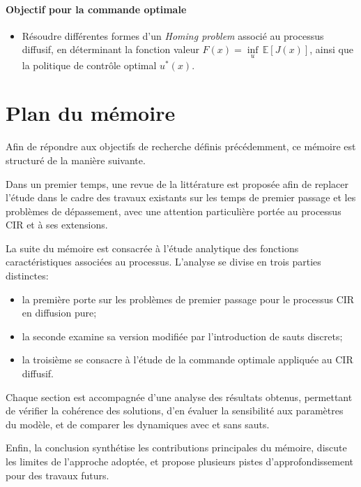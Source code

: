 \paragraph{Objectif pour la commande optimale}
\begin{itemize}
    \item Résoudre différentes formes d'un \textit{Homing problem} associé au processus diffusif, en déterminant la fonction valeur \( F(x) = \underset{u}{\inf}\,\mathds{E}[J(x)] \), ainsi que la politique de contrôle optimal $u^*(x)$.
\end{itemize}

\section{Plan du mémoire}  %
Afin de répondre aux objectifs de recherche définis précédemment, ce mémoire est structuré de la manière suivante.

Dans un premier temps, une revue de la littérature est proposée afin de replacer l'étude dans le cadre des travaux existants sur les temps de premier passage et les problèmes de dépassement, avec une attention particulière portée au processus \acs{CIR} et à ses extensions.

La suite du mémoire est consacrée à l'étude analytique des fonctions caractéristiques associées au processus. L'analyse se divise en trois parties distinctes: 
\begin{itemize}
    \item la première porte sur les problèmes de premier passage pour le processus \acs{CIR} en diffusion pure;
    \item la seconde examine sa version modifiée par l'introduction de sauts discrets;
    \item la troisième se consacre à l'étude de la commande optimale appliquée au \acs{CIR} diffusif.
\end{itemize}

Chaque section est accompagnée d'une analyse des résultats obtenus, permettant de vérifier la cohérence des solutions, d'en évaluer la sensibilité aux paramètres du modèle, et de comparer les dynamiques avec et sans sauts.

Enfin, la conclusion synthétise les contributions principales du mémoire, discute les limites de l'approche adoptée, et propose plusieurs pistes d'approfondissement pour des travaux futurs.

